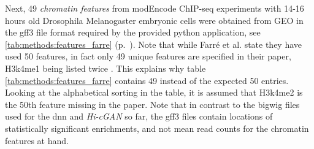 Next, 49 \emph{chromatin features} from modEncode ChIP-seq experiments with 14-16 hours old Drosophila Melanogaster embryonic cells \cite{Roy2010}
were obtained from GEO in the gff3 file format required by the provided python application, see \cref{tab:methods:features_farre} (p.~\pageref{tab:methods:features_farre}).
Note that while Farr\'e et al. state they have used 50 features, in fact only 49 unique features are specified in their paper, H3k4me1 being listed twice \cite[p.~9]{Farre2018a}.
This explains why table \ref{tab:methods:features_farre} contains 49 instead of the expected 50 entries. 
Looking at the alphabetical sorting in the table, it is assumed that H3k4me2 is the 50th feature missing in the paper.
Note that in contrast to the bigwig files used for the \acrshort{dnn} and \emph{Hi-cGAN} so far, the gff3 files contain locations of statistically significant enrichments,
and not mean read counts for the chromatin features at hand.
